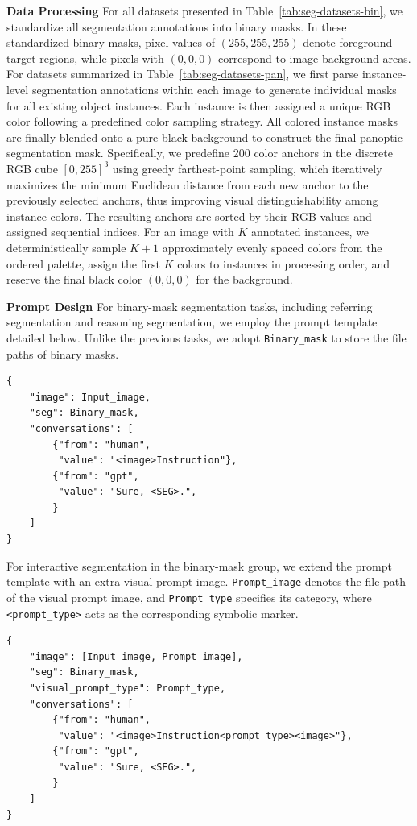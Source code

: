\textbf{Data Processing}
For all datasets presented in Table~\ref{tab:seg-datasets-bin}, we standardize all segmentation annotations into binary masks.
In these standardized binary masks, pixel values of $(255,255,255)$ denote foreground target regions, while pixels with $(0,0,0)$ correspond to image background areas.
For datasets summarized in Table~\ref{tab:seg-datasets-pan}, we first parse instance-level segmentation annotations within each image to generate individual masks for all existing object instances.
Each instance is then assigned a unique RGB color following a predefined color sampling strategy.
All colored instance masks are finally blended onto a pure black background to construct the final panoptic segmentation mask.
Specifically, we predefine 200 color anchors in the discrete RGB cube $[0,255]^3$ using greedy farthest-point sampling, which iteratively maximizes the minimum Euclidean distance from each new anchor to the previously selected anchors, thus improving visual distinguishability among instance colors.
The resulting anchors are sorted by their RGB values and assigned sequential indices.
For an image with $K$ annotated instances, we deterministically sample $K+1$ approximately evenly spaced colors from the ordered palette, assign the first $K$ colors to instances in processing order, and reserve the final black color $(0,0,0)$ for the background.

\textbf{Prompt Design}
For binary-mask segmentation tasks, including referring segmentation and reasoning segmentation, we employ the prompt template detailed below.
Unlike the previous tasks, we adopt \texttt{Binary\_mask} to store the file paths of binary masks.

\begin{lstlisting}
{
    "image": Input_image,
    "seg": Binary_mask,
    "conversations": [
        {"from": "human",
         "value": "<image>Instruction"},
        {"from": "gpt",
         "value": "Sure, <SEG>.",
        }
    ]
}
\end{lstlisting}

For interactive segmentation in the binary-mask group, we extend the prompt template with an extra visual prompt image. \texttt{Prompt\_image} denotes the file path of the visual prompt image, and \texttt{Prompt\_type} specifies its category, where \texttt{<prompt\_type>} acts as the corresponding symbolic marker.

\begin{lstlisting}
{
    "image": [Input_image, Prompt_image],
    "seg": Binary_mask,
    "visual_prompt_type": Prompt_type,
    "conversations": [
        {"from": "human",
         "value": "<image>Instruction<prompt_type><image>"},
        {"from": "gpt",
         "value": "Sure, <SEG>.",
        }
    ]
}
\end{lstlisting}

